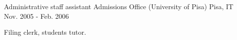 \begin{cventries}
  \cventry
    {Administrative staff assistant} %
    {Admissions Office (University of Pisa)} %
    {Pisa, IT} %
    {Nov. 2005 - Feb. 2006} %
    {
      \begin{cvitems} %
	\item {Filing clerk, students tutor.}
      \end{cvitems}
    }

\end{cventries}
